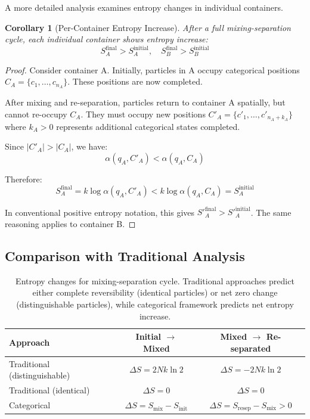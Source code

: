 \documentclass[12pt,a4paper]{article}
\newtheorem{corollary}[theorem]{Corollary}
\theoremstyle{remark}
\begin{document}
A more detailed analysis examines entropy changes in individual containers.

\begin{corollary}[Per-Container Entropy Increase]
\label{cor:per_container}
After a full mixing-separation cycle, each individual container shows entropy increase:
\begin{equation}
S_A^\text{final} > S_A^\text{initial}, \quad S_B^\text{final} > S_B^\text{initial}
\end{equation}
\end{corollary}

\begin{proof}
Consider container A. Initially, particles in A occupy categorical positions $C_A = \{c_1, \ldots, c_{n_A}\}$. These positions are now completed.

After mixing and re-separation, particles return to container A spatially, but cannot re-occupy $C_A$. They must occupy new positions $C'_A = \{c'_1, \ldots, c'_{n_A + k_A}\}$ where $k_A > 0$ represents additional categorical states completed.

Since $|C'_A| > |C_A|$, we have:
\begin{equation}
\alpha(q_A, C'_A) < \alpha(q_A, C_A)
\end{equation}

Therefore:
\begin{equation}
S_A^\text{final} = k \log \alpha(q_A, C'_A) < k \log \alpha(q_A, C_A) = S_A^\text{initial}
\end{equation}

In conventional positive entropy notation, this gives $S'_A^\text{final} > S'_A^\text{initial}$. The same reasoning applies to container B.
\end{proof}

\subsection{Comparison with Traditional Analysis}

\begin{table}[H]
\centering
\begin{tabular}{lcc}
\toprule
\textbf{Approach} & \textbf{Initial $\rightarrow$ Mixed} & \textbf{Mixed $\rightarrow$ Re-separated} \\
\midrule
Traditional (distinguishable) & $\Delta S = 2Nk \ln 2$ & $\Delta S = -2Nk \ln 2$ \\
Traditional (identical) & $\Delta S = 0$ & $\Delta S = 0$ \\
Categorical & $\Delta S = S_\text{mix} - S_\text{init}$ & $\Delta S = S_\text{resep} - S_\text{mix} > 0$ \\
\bottomrule
\end{tabular}
\caption{Entropy changes for mixing-separation cycle. Traditional approaches predict either complete reversibility (identical particles) or net zero change (distinguishable particles), while categorical framework predicts net entropy increase.}
\label{tab:comparison}
\end{table}
\end{document}
